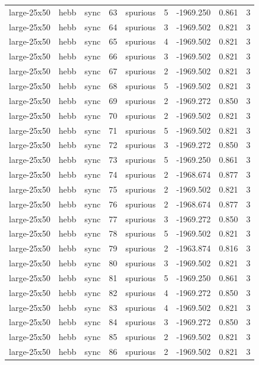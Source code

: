 \begin{tabular}{lllrlrrrr}
large-25x50 & hebb & sync & 63 & spurious & 5 & -1969.250 & 0.861 & 3 \\
large-25x50 & hebb & sync & 64 & spurious & 3 & -1969.502 & 0.821 & 3 \\
large-25x50 & hebb & sync & 65 & spurious & 4 & -1969.502 & 0.821 & 3 \\
large-25x50 & hebb & sync & 66 & spurious & 3 & -1969.502 & 0.821 & 3 \\
large-25x50 & hebb & sync & 67 & spurious & 2 & -1969.502 & 0.821 & 3 \\
large-25x50 & hebb & sync & 68 & spurious & 5 & -1969.502 & 0.821 & 3 \\
large-25x50 & hebb & sync & 69 & spurious & 2 & -1969.272 & 0.850 & 3 \\
large-25x50 & hebb & sync & 70 & spurious & 2 & -1969.502 & 0.821 & 3 \\
large-25x50 & hebb & sync & 71 & spurious & 5 & -1969.502 & 0.821 & 3 \\
large-25x50 & hebb & sync & 72 & spurious & 3 & -1969.272 & 0.850 & 3 \\
large-25x50 & hebb & sync & 73 & spurious & 5 & -1969.250 & 0.861 & 3 \\
large-25x50 & hebb & sync & 74 & spurious & 2 & -1968.674 & 0.877 & 3 \\
large-25x50 & hebb & sync & 75 & spurious & 2 & -1969.502 & 0.821 & 3 \\
large-25x50 & hebb & sync & 76 & spurious & 2 & -1968.674 & 0.877 & 3 \\
large-25x50 & hebb & sync & 77 & spurious & 3 & -1969.272 & 0.850 & 3 \\
large-25x50 & hebb & sync & 78 & spurious & 5 & -1969.502 & 0.821 & 3 \\
large-25x50 & hebb & sync & 79 & spurious & 2 & -1963.874 & 0.816 & 3 \\
large-25x50 & hebb & sync & 80 & spurious & 3 & -1969.502 & 0.821 & 3 \\
large-25x50 & hebb & sync & 81 & spurious & 5 & -1969.250 & 0.861 & 3 \\
large-25x50 & hebb & sync & 82 & spurious & 4 & -1969.272 & 0.850 & 3 \\
large-25x50 & hebb & sync & 83 & spurious & 4 & -1969.502 & 0.821 & 3 \\
large-25x50 & hebb & sync & 84 & spurious & 3 & -1969.272 & 0.850 & 3 \\
large-25x50 & hebb & sync & 85 & spurious & 2 & -1969.502 & 0.821 & 3 \\
large-25x50 & hebb & sync & 86 & spurious & 2 & -1969.502 & 0.821 & 3 \\

\end{tabular}
